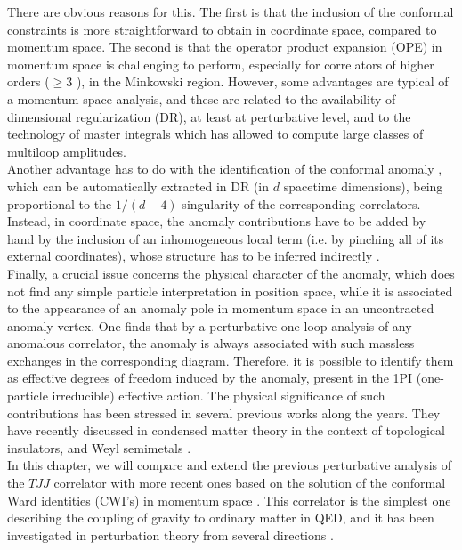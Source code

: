 \documentclass[a4paper,11pt,openright,twoside]{book}
\numberwithin{equation}{section}
\begin{document}
{{There are obvious reasons for this. The first is that the inclusion of the conformal constraints is more straightforward to obtain in coordinate space, compared to momentum space. The second is that the operator product expansion (OPE) in momentum space is challenging to perform, especially for correlators of higher orders ($\geq 3$ ), in the Minkowski region. 
However, some advantages are typical of a momentum space analysis, and these are related to the availability of dimensional regularization (DR), at least at perturbative level, and to the technology of master integrals which has allowed to compute large classes of multiloop amplitudes. \\ 
Another advantage has to do with the identification of the conformal anomaly \cite{Capper:1975ig}, which can be automatically extracted in DR (in $d$ spacetime dimensions), being proportional to the $1/(d-4)$ singularity of the corresponding correlators. Instead, in coordinate space, the anomaly contributions have to be added by hand by the inclusion of an inhomogeneous local term (i.e. by pinching all of its external coordinates), whose structure has to be inferred indirectly  \cite{Osborn:1993cr}. \\  
Finally, a crucial issue concerns the physical character of the anomaly, which does not find any simple particle interpretation in position space, while it is associated to the appearance of an anomaly pole in momentum space \cite{Giannotti:2008cv,2009PhLB..682..322A,Armillis:2009sm} in an uncontracted anomaly vertex. One finds that by a perturbative one-loop analysis of any anomalous correlator, the anomaly is always associated with such massless exchanges in the corresponding diagram. Therefore, it is possible to identify them as effective degrees of freedom induced by the anomaly, present in the 1PI (one-particle irreducible) effective action. The physical significance of such contributions has been stressed in several previous works \cite{Giannotti:2008cv,Armillis:2009pq, Armillis:2009sm} along the years. They have recently discussed in condensed matter theory in the context of topological insulators, and Weyl semimetals \cite{Chernodub:2017jcp,Rinkel:2016dxo}.\\
In this chapter, we will compare and extend the previous perturbative analysis of the $TJJ$ correlator with more recent ones based on the solution of the conformal Ward identities (CWI's) in momentum space \cite{Bzowski:2013sza,Bzowski:2015yxv,Bzowski:2017poo}. This correlator is the simplest one describing the coupling of gravity to ordinary matter in QED, and it has been investigated in perturbation theory from several directions \cite{Bastianelli:2012es,Bastianelli:2012bz,Bonora:2017gzz,Bonora:2014qla, Bastianelli:2016nuf}. 
}}
\end{document}
